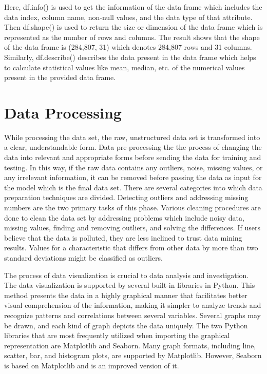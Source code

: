Here, df.info() is used to get the information of the data frame which includes the data index, column name, non-null values, and the data type of that attribute. Then df.shape() is used to return the size or dimension of the data frame which is represented as the number of rows and columns. The result shows that the shape of the data frame is (284,807, 31) which denotes 284,807 rows and 31 columns. Similarly, df.describe() describes the data present in the data frame which helps to calculate statistical values like mean, median, etc. of the numerical values present in the provided data frame.


\section{Data Processing}
While processing the data set, the raw, unstructured data set is transformed into a clear, understandable form. Data pre-processing the the process of changing the data into relevant and appropriate forms before sending the data for training and testing. In this way, if the raw data contains any outliers, noise, missing values, or any irrelevant information, it can be removed before passing the data as input for the model which is the final data set. There are several  categories into which data preparation techniques are divided. Detecting outliers and addressing missing numbers are the two primary tasks of this phase. Various cleaning procedures are done to clean the data set by addressing problems which include noisy data, missing values, finding and removing outliers, and solving the differences. If users believe that the data is polluted, they are less inclined to trust data mining results. Values for a characteristic that differs from other data by more than two standard deviations might be classified as outliers. 

The process of data visualization is crucial to data analysis and investigation. The data visualization is supported by several built-in libraries in Python. This method presents the data in a highly graphical manner that facilitates better visual comprehension of the information, making it simpler to analyze trends and recognize patterns and correlations between several variables. Several graphs may be drawn, and each kind of graph depicts the data uniquely. The two Python libraries that are most frequently utilized when importing the graphical representation are Matplotlib and Seaborn. Many graph formats, including line, scatter, bar, and histogram plots, are supported by Matplotlib. However, Seaborn is based on Matplotlib and is an improved version of it. 

